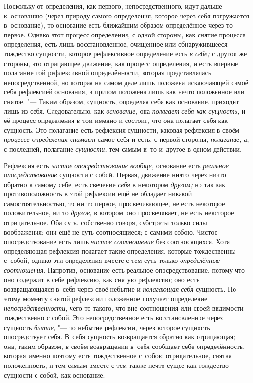 Поскольку от определения, как первого, непосредственного, идут дальше
к~основанию (через природу самого определения, которое через себя погружается
в~основание), то основание есть ближайшим образом определённое через то первое.
Однако этот процесс определения, с одной стороны, как снятие процесса
определения, есть лишь восстановленное, очищенное или обнаружившееся тождество
сущности, которое рефлексивное определение есть {\em в себе;} с другой же
стороны, это отрицающее движение, как процесс определения, и есть впервые
полагание той рефлексивной определённости, которая представлялась
непосредственной, но которая на самом деле лишь положена исключающей самоё себя
рефлексией основания, и притом положена лишь как нечто положенное или снятое.
"--- Таким образом, сущность, определяя себя как основание, приходит лишь из
себя. Следовательно, как {\em основание,} она {\em полагает себя как сущность,}
и её процесс определения в том именно и состоит, что она полагает себя как
сущность. Это полагание есть рефлексия сущности, каковая рефлексия в своём
{\em процессе определения снимает} самое себя и есть, с первой стороны,
{\em полагание,} а, с последней, полагание {\em сущности,} тем самым
и~то и~другое в одном действии.

Рефлексия есть {\em чистое опосредствование вообще,} основание есть
{\em реальное опосредствование} сущности с собой. Первая, движение ничто через
ничто обратно к самому себе, есть свечение {\em себя} в некотором {\em другом;}
но так как противоположность в этой рефлексии ещё не обладает никакой
самостоятельностью, то ни то первое, просвечивающее, не есть некоторое
положительное, ни то {\em другое,} в котором оно просвечивает, не есть
некоторое отрицательное. Оба суть, собственно говоря, субстраты только силы
воображения; они ещё не суть соотносящиеся; с самими собою. Чистое
опосредствование есть лишь {\em чистое соотношение} без соотносящихся. Хотя
определяющая рефлексия полагает такие определения, которые тождественны
с~собой, однако эти определения вместе с тем суть только {\em определённые
соотношения}. Напротив, основание есть реальное опосредствование, потому что
оно содержит в себе рефлексию, как снятую рефлексию; оно есть возвращающаяся
в~себя через своё небытие и {\em полагающая себя} сущность. По этому моменту
снятой рефлексии положенное получает определение {\em непосредственности,}
чего-то такого, что вне соотношения или своей видимости тождественно с собой.
Это непосредственное есть восстановленное через сущность {\em бытие,} "--- то
небытие рефлексии, через которое сущность опосредствует себя. В~себя сущность
возвращается обратно как отрицающая; она, таким образом, в своём возвращении
в~себя сообщает себе определённость, которая именно поэтому есть тождественное
с~собою отрицательное, снятая положенность, и тем самым вместе с тем также
нечто сущее как тождество сущности с собой, как основание.

